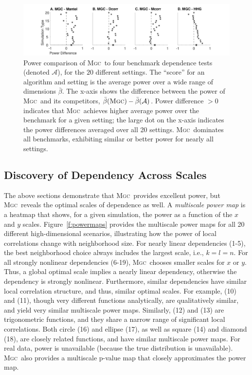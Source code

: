 \documentclass[11pt]{article}
\providecommand{\sct}[1]{{\normalfont\textsc{#1}}}
\newcommand{\Mgc}{\sct{Mgc}}
\begin{document}
\begin{figure}
  \centering
  \includegraphics[width=1.0\textwidth,trim={3.5cm 0 3.5cm 0},clip]{Figures/FigHDPowerMGCM}
  \caption{Power comparison of  \Mgc~to four benchmark dependence tests (denoted $\mathcal{A}$), for the $20$ different settings.  The ``score'' for an algorithm and setting is the average power over a wide range of dimensions $\bar{\beta}$. The x-axis shows the difference between the power of \Mgc~and its competitors,  $\bar{\beta}(\Mgc)-\bar{\beta}(\mathcal{A})$. Power difference $>0$ indicates that \Mgc~achieves higher average power over the benchmark for a given setting;
the large dot on the x-axis indicates the  power differences averaged over all 20 settings.
\Mgc~dominates all benchmarks, exhibiting similar or better power for nearly all settings. 
}
\label{f:nDSummary}
\end{figure}


\subsection*{Discovery of Dependency Across Scales}
\label{main3}

The above sections demonstrate that \Mgc~provides excellent power, but \Mgc~reveals the optimal scales of dependence as well. 
A \emph{multiscale power map} is a heatmap that shows, for a given simulation, the power as a function of the $x$ and $y$ scales.  
Figure~\ref{f:powermaps} provides the multiscale power maps for all 20 different high-dimensional scenarios, illustrating how the power of local correlations change with  neighborhood size.
For nearly linear dependencies (1-5), the best neighborhood choice always includes the largest scale, i.e., $k=l=n$. For all strongly nonlinear dependencies (6-19),  \Mgc~chooses smaller scales for $x$ or $y$. Thus, a global optimal scale implies a nearly linear dependency, otherwise the dependency is strongly nonlinear.
Furthermore, similar dependencies have similar local correlation structure, and thus, similar optimal scales. For example, (10) and (11), though very different functions analytically, are qualitatively similar, and yield very similar multiscale power maps.
Similarly,  (12) and (13) are trigonometric functions, and they share a narrow range of significant local correlations.
Both circle (16) and ellipse (17), as well as square (14) and diamond (18), are closely related functions, and have similar multiscale power maps. 
For real data, power is unavailable (because the true distribution is unavailable).  \Mgc~also provides a multiscale p-value map that closely approximates the power map.
\end{document}
